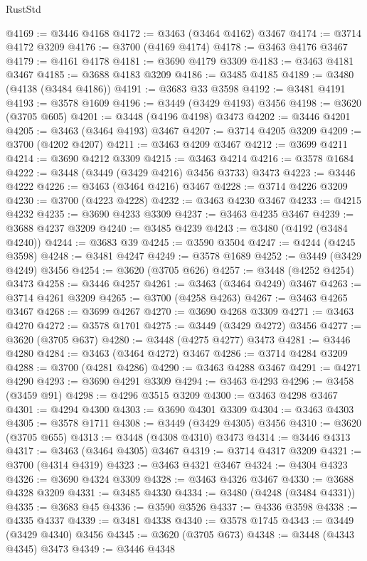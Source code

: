 \begin{lexlean}{RustStd}
\begin{coremodule}
{{{{{{{{{{{{{{{{{{{@4169 := @3446 @4168
@4172 := @3463 (@3464 @4162) @3467
@4174 := @3714 @4172 @3209
@4176 := @3700 (@4169 @4174)
@4178 := @3463 @4176 @3467
@4179 := @4161 @4178
@4181 := @3690 @4179 @3309
@4183 := @3463 @4181 @3467
@4185 := @3688 @4183 @3209
@4186 := @3485 @4185
@4189 := @3480 (@4138 (@3484 @4186))
@4191 := @3683 @33 @3598
@4192 := @3481 @4191
@4193 := @3578 @1609
@4196 := @3449 (@3429 @4193) @3456
@4198 := @3620 (@3705 @605)
@4201 := @3448 (@4196 @4198) @3473
@4202 := @3446 @4201
@4205 := @3463 (@3464 @4193) @3467
@4207 := @3714 @4205 @3209
@4209 := @3700 (@4202 @4207)
@4211 := @3463 @4209 @3467
@4212 := @3699 @4211
@4214 := @3690 @4212 @3309
@4215 := @3463 @4214
@4216 := @3578 @1684
@4222 := @3448 (@3449 (@3429 @4216) @3456 @3733) @3473
@4223 := @3446 @4222
@4226 := @3463 (@3464 @4216) @3467
@4228 := @3714 @4226 @3209
@4230 := @3700 (@4223 @4228)
@4232 := @3463 @4230 @3467
@4233 := @4215 @4232
@4235 := @3690 @4233 @3309
@4237 := @3463 @4235 @3467
@4239 := @3688 @4237 @3209
@4240 := @3485 @4239
@4243 := @3480 (@4192 (@3484 @4240))
@4244 := @3683 @39
@4245 := @3590 @3504
@4247 := @4244 (@4245 @3598)
@4248 := @3481 @4247
@4249 := @3578 @1689
@4252 := @3449 (@3429 @4249) @3456
@4254 := @3620 (@3705 @626)
@4257 := @3448 (@4252 @4254) @3473
@4258 := @3446 @4257
@4261 := @3463 (@3464 @4249) @3467
@4263 := @3714 @4261 @3209
@4265 := @3700 (@4258 @4263)
@4267 := @3463 @4265 @3467
@4268 := @3699 @4267
@4270 := @3690 @4268 @3309
@4271 := @3463 @4270
@4272 := @3578 @1701
@4275 := @3449 (@3429 @4272) @3456
@4277 := @3620 (@3705 @637)
@4280 := @3448 (@4275 @4277) @3473
@4281 := @3446 @4280
@4284 := @3463 (@3464 @4272) @3467
@4286 := @3714 @4284 @3209
@4288 := @3700 (@4281 @4286)
@4290 := @3463 @4288 @3467
@4291 := @4271 @4290
@4293 := @3690 @4291 @3309
@4294 := @3463 @4293
@4296 := @3458 (@3459 @91)
@4298 := @4296 @3515 @3209
@4300 := @3463 @4298 @3467
@4301 := @4294 @4300
@4303 := @3690 @4301 @3309
@4304 := @3463 @4303
@4305 := @3578 @1711
@4308 := @3449 (@3429 @4305) @3456
@4310 := @3620 (@3705 @655)
@4313 := @3448 (@4308 @4310) @3473
@4314 := @3446 @4313
@4317 := @3463 (@3464 @4305) @3467
@4319 := @3714 @4317 @3209
@4321 := @3700 (@4314 @4319)
@4323 := @3463 @4321 @3467
@4324 := @4304 @4323
@4326 := @3690 @4324 @3309
@4328 := @3463 @4326 @3467
@4330 := @3688 @4328 @3209
@4331 := @3485 @4330
@4334 := @3480 (@4248 (@3484 @4331))
@4335 := @3683 @45
@4336 := @3590 @3526
@4337 := @4336 @3598
@4338 := @4335 @4337
@4339 := @3481 @4338
@4340 := @3578 @1745
@4343 := @3449 (@3429 @4340) @3456
@4345 := @3620 (@3705 @673)
@4348 := @3448 (@4343 @4345) @3473
@4349 := @3446 @4348
}}}}}}}}}}}}}}}}}}}
\end{coremodule}
\end{lexlean}
